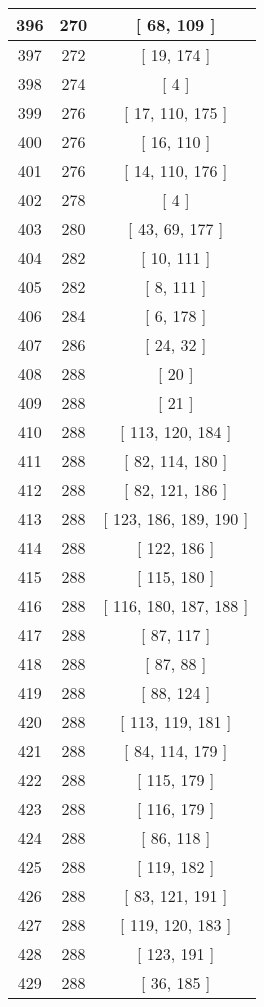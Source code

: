 \begin{center}
\begin{longtable}[H]{|| c c c ||}
\hline
396 & 270 & [ 68, 109 ] \\ 
\hline
397 & 272 & [ 19, 174 ] \\ 
\hline
398 & 274 & [ 4 ] \\ 
\hline
399 & 276 & [ 17, 110, 175 ] \\ 
\hline
400 & 276 & [ 16, 110 ] \\ 
\hline
401 & 276 & [ 14, 110, 176 ] \\ 
\hline
402 & 278 & [ 4 ] \\ 
\hline
403 & 280 & [ 43, 69, 177 ] \\ 
\hline
404 & 282 & [ 10, 111 ] \\ 
\hline
405 & 282 & [ 8, 111 ] \\ 
\hline
406 & 284 & [ 6, 178 ] \\ 
\hline
407 & 286 & [ 24, 32 ] \\ 
\hline
408 & 288 & [ 20 ] \\ 
\hline
409 & 288 & [ 21 ] \\ 
\hline
410 & 288 & [ 113, 120, 184 ] \\ 
\hline
411 & 288 & [ 82, 114, 180 ] \\ 
\hline
412 & 288 & [ 82, 121, 186 ] \\ 
\hline
413 & 288 & [ 123, 186, 189, 190 ] \\ 
\hline
414 & 288 & [ 122, 186 ] \\ 
\hline
415 & 288 & [ 115, 180 ] \\ 
\hline
416 & 288 & [ 116, 180, 187, 188 ] \\ 
\hline
417 & 288 & [ 87, 117 ] \\ 
\hline
418 & 288 & [ 87, 88 ] \\ 
\hline
419 & 288 & [ 88, 124 ] \\ 
\hline
420 & 288 & [ 113, 119, 181 ] \\ 
\hline
421 & 288 & [ 84, 114, 179 ] \\ 
\hline
422 & 288 & [ 115, 179 ] \\ 
\hline
423 & 288 & [ 116, 179 ] \\ 
\hline
424 & 288 & [ 86, 118 ] \\ 
\hline
425 & 288 & [ 119, 182 ] \\ 
\hline
426 & 288 & [ 83, 121, 191 ] \\ 
\hline
427 & 288 & [ 119, 120, 183 ] \\ 
\hline
428 & 288 & [ 123, 191 ] \\ 
\hline
429 & 288 & [ 36, 185 ] \\ 

\end{longtable}
\end{center}
